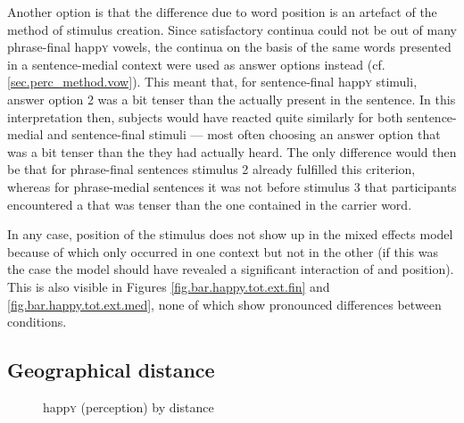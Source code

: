 Another option is that the difference due to word position is an artefact of the method of stimulus creation.
Since satisfactory continua could not be  out of many phrase-final happ\textsc{y} vowels, the continua  on the basis of the same words presented in a sentence-medial context were used as answer options instead (cf. \ref{sec.perc_method.vow}).
This meant that, for sentence-final happ\textsc{y} stimuli, answer option 2 was a bit tenser than the  actually present in the sentence.
In this interpretation then, subjects would have reacted quite similarly for both sentence-medial and sentence-final stimuli --- most often choosing an answer option that was a bit tenser than the  they had actually heard.
The only difference would then be that for phrase-final sentences stimulus 2 already fulfilled this criterion, whereas for phrase-medial sentences it was not before stimulus 3 that participants encountered a  that was tenser than the one contained in the carrier word.

In any case, position of the stimulus does not show up in the mixed effects model because of  which only occurred in one context but not in the other (if this was the case the model should have revealed a significant interaction of  and position).
This is also visible in Figures \ref{fig.bar.happy.tot.ext.fin} and \ref{fig.bar.happy.tot.ext.med}, none of which show pronounced differences between  conditions.

\subsection{Geographical distance}
\label{sec.perc_res.happy.geography}

\begin{figure}[h]
	\centering
		\resizebox{.49\linewidth}{!}{} 
	\caption{happ\textsc{y} (perception) by distance}
	\label{fig.scatter.happy.ext.dist}
\end{figure}

